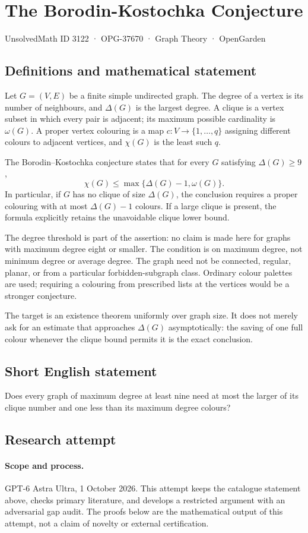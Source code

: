 \documentclass[11pt,a4paper]{article}
\begin{document}
\section*{The Borodin-Kostochka Conjecture}\label{3122}
{\small UnsolvedMath ID 3122 · OPG-37670 · Graph Theory · OpenGarden}
\subsection{Definitions and mathematical statement}
Let $G=(V,E)$ be a finite simple undirected graph. The degree of a
vertex is its number of neighbours, and $\Delta(G)$ is the largest
degree. A clique is a vertex subset in which every pair is adjacent;
its maximum possible cardinality is $\omega(G)$.
A proper vertex colouring is a map $c:V\to\{1,\ldots,q\}$ assigning
different colours to adjacent vertices, and $\chi(G)$ is the least
such $q$.

The Borodin--Kostochka conjecture states that for every $G$ satisfying
$\Delta(G)\ge9$,
\[
 \chi(G)\le\max\{\Delta(G)-1,\omega(G)\}.
\]
In particular, if $G$ has no clique of size $\Delta(G)$, the conclusion
requires a proper colouring with at most $\Delta(G)-1$ colours. If a
large clique is present, the formula explicitly retains the unavoidable
clique lower bound.

The degree threshold is part of the assertion: no claim is made here
for graphs with maximum degree eight or smaller. The condition is on
maximum degree, not minimum degree or average degree. The graph need
not be connected, regular, planar, or from a particular forbidden-subgraph
class. Ordinary colour palettes are used; requiring a colouring from
prescribed lists at the vertices would be a stronger conjecture.

The target is an existence theorem uniformly over graph size. It does
not merely ask for an estimate that approaches $\Delta(G)$ asymptotically:
the saving of one full colour whenever the clique bound permits it is
the exact conclusion.
\subsection{Short English statement}
Does every graph of maximum degree at least nine need at most the larger of its clique number and one less than its maximum degree colours?
\subsection{Research attempt}
\paragraph{Scope and process.}
GPT-6 Astra Ultra, 1 October 2026. This attempt keeps the catalogue statement above, checks primary literature, and develops a restricted argument with an adversarial gap audit. The proofs below are the mathematical output of this attempt, not a claim of novelty or external certification.
\end{document}
